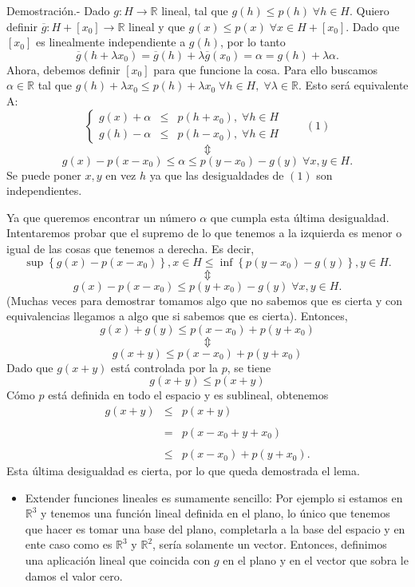 \begin{paracol}{2}
\begin{lema}
	Demostración.-\; Dado $g:H\to \mathbb{R}$ lineal, tal que $g(h)\leq p(h)\; \forall h\in H$. Quiero definir $\overline{g}:H+[x_0]\to \mathbb{R}$ lineal y que $g(x)\leq p(x)\; \forall x\in H+[x_0]$. Dado que $[x_0]$ es linealmente independiente a $g(h)$, por lo tanto
	$$\overline{g}\left(h+\lambda x_0\right)=\overline{g}(h)+\lambda \overline{g}(x_0)=\alpha=g(h)+\lambda \alpha.$$
	Ahora, debemos definir $[x_0]$ para que funcione la cosa. Para ello buscamos $\alpha\in \mathbb{R}$ tal que $g(h)+\lambda x_0\leq p(h)+\lambda x_0\; \forall h\in H, \;\forall \lambda\in \mathbb{R}.$
	Esto será equivalente A:
	$$
	\left\{
	    \begin{array}{rcl}
		g(x)+\alpha&\leq&p(h+x_0),\; \forall h\in H\\
		g(h)-\alpha&\leq&p(h-x_0),\; \forall h\in H
	    \end{array}
	\right. \qquad (1)
	$$
	$$\Updownarrow$$
	$$g(x)-p(x-x_0)\leq \alpha \leq p(y-x_0)-g(y)\; \forall x,y\in H.$$
	Se puede poner $x,y$ en vez $h$ ya que las desigualdades de $(1)$ son independientes.

	Ya que queremos encontrar un número $\alpha$ que cumpla esta última desigualdad. Intentaremos probar que el supremo de lo que tenemos a la izquierda es menor o igual de las cosas que tenemos a derecha. Es decir,
	$$\sup\left\{g(x)-p(x-x_0)\right\},x\in H\leq \inf\left\{p(y-x_0)-g(y)\right\},y\in H.$$
	$$\Updownarrow$$
	$$g(x)-p(x-x_0)\leq p(y+x_0)-g(y)\; \forall x,y\in H.$$
	(Muchas veces para demostrar tomamos algo que no sabemos que es cierta y con equivalencias llegamos a algo que si sabemos que es cierta). Entonces, 
	$$g(x)+g(y)\leq p(x-x_0)+p(y+x_0)$$
	$$\Updownarrow$$
	$$g(x+y)\leq p(x-x_0)+p(y+x_0)$$
	Dado que $g(x+y)$ está controlada por la $p$, se tiene
	$$g(x+y)\leq p(x+y)$$
	Cómo $p$ está definida en todo el espacio y es sublineal, obtenemos
	$$
	\begin{array}{rcl}
	    g(x+y)&\leq& p(x+y)\\\\
		  &=& p(x-x_0+y+x_0)\\\\
		  &\leq& p(x-x_0)+p(y+x_0).
	\end{array}
	$$
	Esta última desigualdad es cierta, por lo que queda demostrada el lema.
\end{lema}

\begin{itemize}
    \item Extender funciones lineales es sumamente sencillo: Por ejemplo si estamos en $\mathbb{R}^3$ y tenemos una función lineal definida en el plano, lo único que tenemos que hacer es tomar una base del plano, completarla a la base del espacio y en ente caso como es $\mathbb{R}^3$ y $\mathbb{R}^2$, sería solamente un vector. Entonces, definimos una aplicación lineal que coincida con $g$ en el plano y en el vector que sobra le damos el valor cero.
\end{itemize}


\end{paracol}
